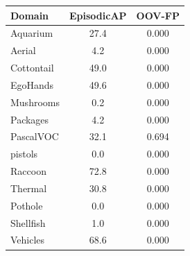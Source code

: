 \begin{tabular}{l cc}
\toprule
Domain & EpisodicAP & OOV-FP \\
\midrule
Aquarium & 27.4 & 0.000 \\
Aerial & 4.2 & 0.000 \\
Cottontail & 49.0 & 0.000 \\
EgoHands & 49.6 & 0.000 \\
Mushrooms & 0.2 & 0.000 \\
Packages & 4.2 & 0.000 \\
PascalVOC & 32.1 & 0.694 \\
pistols & 0.0 & 0.000 \\
Raccoon & 72.8 & 0.000 \\
Thermal & 30.8 & 0.000 \\
Pothole & 0.0 & 0.000 \\
Shellfish & 1.0 & 0.000 \\
Vehicles & 68.6 & 0.000 \\
\bottomrule
\end{tabular}
